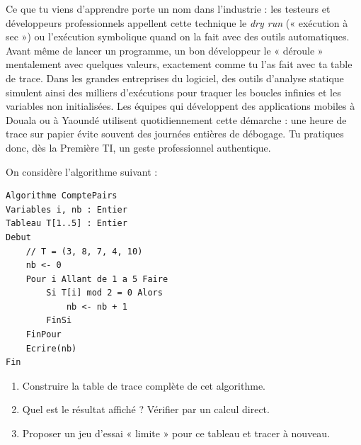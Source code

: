 \documentclass[11pt]{article}
\newcommand{\cle}[1]{{\popxbold\color{popdark}#1}}
\begin{document}
\begin{savaistu}
Ce que tu viens d'apprendre porte un nom dans l'industrie : les testeurs et développeurs professionnels appellent cette technique le \emph{dry run} (« exécution à sec ») ou l'\cle{exécution symbolique} quand on la fait avec des outils automatiques. Avant même de lancer un programme, un bon développeur le « déroule » mentalement avec quelques valeurs, exactement comme tu l'as fait avec ta table de trace. Dans les grandes entreprises du logiciel, des outils d'analyse statique simulent ainsi des milliers d'exécutions pour traquer les boucles infinies et les variables non initialisées. Les équipes qui développent des applications mobiles à Douala ou à Yaoundé utilisent quotidiennement cette démarche : une heure de trace sur papier évite souvent des journées entières de débogage. Tu pratiques donc, dès la Première TI, un geste professionnel authentique.
\end{savaistu}

\begin{exercice}
On considère l'algorithme suivant :

\begin{lstlisting}
Algorithme ComptePairs
Variables i, nb : Entier
Tableau T[1..5] : Entier
Debut
    // T = (3, 8, 7, 4, 10)
    nb <- 0
    Pour i Allant de 1 a 5 Faire
        Si T[i] mod 2 = 0 Alors
            nb <- nb + 1
        FinSi
    FinPour
    Ecrire(nb)
Fin
\end{lstlisting}

\begin{enumerate}
\item Construire la table de trace complète de cet algorithme.
\item Quel est le résultat affiché ? Vérifier par un calcul direct.
\item Proposer un jeu d'essai « limite » pour ce tableau et tracer à nouveau.
\end{enumerate}
\end{exercice}
\end{document}

